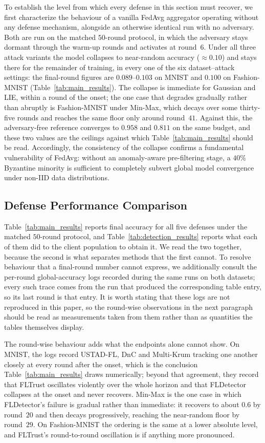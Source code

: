 \documentclass[journal]{IEEEtran}
\begin{document}
To establish the level from which every defense in this section must recover, we first characterize the behaviour of a vanilla FedAvg aggregator operating without any defense mechanism, alongside an otherwise identical run with no adversary. Both are run on the matched $50$-round protocol, in which the adversary stays dormant through the warm-up rounds and activates at round~$6$. Under all three attack variants the model collapses to near-random accuracy ($\approx 0.10$) and stays there for the remainder of training, in every one of the six dataset--attack settings: the final-round figures are $0.089$--$0.103$ on MNIST and $0.100$ on Fashion-MNIST (Table~\ref{tab:main_results}). The collapse is immediate for Gaussian and LIE, within a round of the onset; the one case that degrades gradually rather than abruptly is Fashion-MNIST under Min-Max, which decays over some thirty-five rounds and reaches the same floor only around round~$41$. Against this, the adversary-free reference converges to $0.958$ and $0.811$ on the same budget, and these two values are the ceilings against which Table~\ref{tab:main_results} should be read. Accordingly, the consistency of the collapse confirms a fundamental vulnerability of FedAvg: without an anomaly-aware pre-filtering stage, a $40\%$ Byzantine minority is sufficient to completely subvert global model convergence under non-IID data distributions.


\subsection{Defense Performance Comparison}
\label{sec:defense_comparison}

Table~\ref{tab:main_results} reports final accuracy for all five defenses under the matched
$50$-round protocol, and Table~\ref{tab:detection_results} reports what each of them did to
the client population to obtain it. We read the two together, because the second is what
separates methods that the first cannot. To resolve behaviour that a final-round number cannot
express, we additionally consult the per-round global-accuracy logs recorded during the same
runs on both datasets; every such trace comes from the run that produced the corresponding
table entry, so its last round is that entry. It is worth stating that these logs are not
reproduced in this paper, so the round-wise observations in the next paragraph should be read
as measurements taken from them rather than as quantities the tables themselves display.

The round-wise behaviour adds what the endpoints alone cannot show. On MNIST, the logs record
USTAD-FL, DnC and Multi-Krum tracking one another closely at every round after the onset,
which is the conclusion Table~\ref{tab:main_results} draws numerically; beyond that agreement,
they record that FLTrust oscillates violently over the whole horizon and that FLDetector
collapses at the onset and never recovers. Min-Max is the one case in which FLDetector's
failure is gradual rather than immediate: it recovers to about $0.6$ by round~$20$ and then
decays progressively, reaching the near-random floor by round~$29$. On Fashion-MNIST the
ordering is the same at a lower absolute level, and FLTrust's round-to-round oscillation is if
anything more pronounced.
\end{document}
